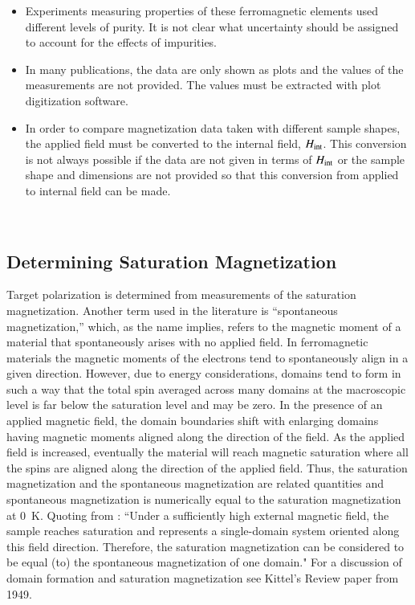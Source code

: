\documentclass[preprint,12pt]{elsarticle}
\begin{document}
\begin{itemize}
\item{Experiments measuring properties of these ferromagnetic elements used different levels of purity. It is not clear what uncertainty should be assigned to account for the effects of impurities.}
\item{In many publications, the data are only shown as plots and the values of the measurements are not provided. The values must be extracted with plot digitization software. }
\item{In order to compare magnetization data taken with different sample shapes, the applied field must be converted to the internal field, $H_{\rm int}$. This conversion is not always possible if the data are not given in terms of $H_{\rm int}$ or the sample shape and dimensions are not provided so that this conversion from applied to internal field can be made.}
\end{itemize}

\

\subsection{Determining Saturation Magnetization}\label{method}
Target polarization is determined from measurements of the saturation magnetization. Another term used in the literature is ``spontaneous magnetization,'' which, as the name implies, refers to the magnetic moment of a material that spontaneously arises with no applied field. In ferromagnetic materials the magnetic moments of the electrons tend to spontaneously align in a given direction. However, due to energy considerations, domains tend to form in such a way that the total spin averaged across many domains at the macroscopic level is far below the saturation level and may be zero. In the presence of an applied magnetic field, the domain boundaries shift with enlarging domains having magnetic moments aligned along the direction of the field. As the applied field is increased, eventually the material will reach magnetic saturation where all the spins are aligned along the direction of the applied field. Thus, the saturation magnetization and the spontaneous magnetization are related quantities and spontaneous magnetization is numerically equal to the saturation magnetization at 0~K. Quoting from \cite{Kraftmakher2005}: ``Under a sufficiently high external magnetic field, the sample reaches saturation and represents a single-domain system oriented along this field direction. Therefore, the saturation magnetization can be considered to be equal (to) the spontaneous magnetization of one domain." For a discussion of domain formation and saturation magnetization see Kittel's Review paper from 1949\cite{KittelOct1949}.
\end{document}
